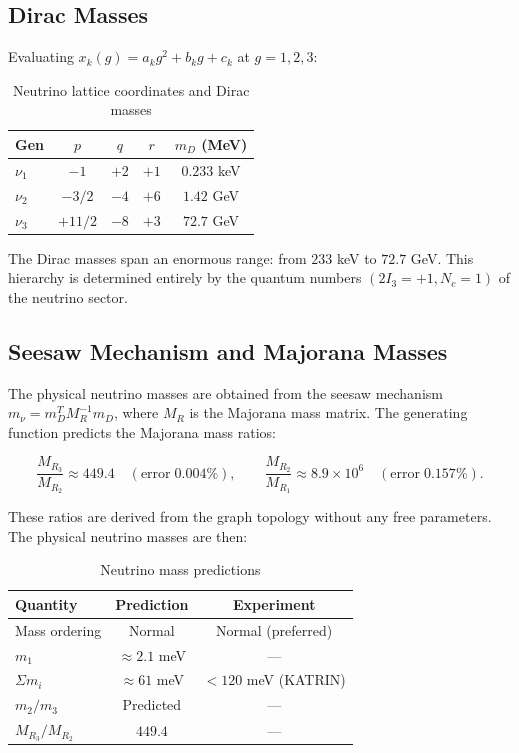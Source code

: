 \subsection{Dirac Masses}\label{sec:neutrino_dirac}

Evaluating $x_k(g) = a_k g^2 + b_k g + c_k$ at $g = 1, 2, 3$:

\begin{table}[h]
\centering
\caption{Neutrino lattice coordinates and Dirac masses}
\label{tab:neutrino_dirac_masses}
\begin{tabular}{lcccc}
\hline\hline
Gen & $p$ & $q$ & $r$ & $m_D$ (MeV) \\
\hline
$\nu_1$ & $-1$ & $+2$ & $+1$ & $0.233$ keV \\
$\nu_2$ & $-3/2$ & $-4$ & $+6$ & $1.42$ GeV \\
$\nu_3$ & $+11/2$ & $-8$ & $+3$ & $72.7$ GeV \\
\hline\hline
\end{tabular}
\end{table}

The Dirac masses span an enormous range: from $233$ keV to $72.7$ GeV. This hierarchy is determined entirely by the quantum numbers $(2I_3 = +1, N_c = 1)$ of the neutrino sector.

\subsection{Seesaw Mechanism and Majorana Masses}\label{sec:neutrino_seesaw}

The physical neutrino masses are obtained from the seesaw mechanism $m_\nu = m_D^T M_R^{-1} m_D$, where $M_R$ is the Majorana mass matrix. The generating function predicts the Majorana mass ratios:

\begin{equation}
\frac{M_{R_3}}{M_{R_2}} \approx 449.4 \quad (\mathrm{error}\; 0.004\%), \qquad
\frac{M_{R_2}}{M_{R_1}} \approx 8.9 \times 10^6 \quad (\mathrm{error}\; 0.157\%).
\end{equation}

These ratios are derived from the graph topology without any free parameters. The physical neutrino masses are then:

\begin{table}[h]
\centering
\caption{Neutrino mass predictions}
\label{tab:neutrino_masses}
\begin{tabular}{lcc}
\hline\hline
Quantity & Prediction & Experiment \\
\hline
Mass ordering & Normal & Normal (preferred) \\
$m_1$ & $\approx 2.1$ meV & --- \\
$\Sigma m_i$ & $\approx 61$ meV & $< 120$ meV (KATRIN) \\
$m_2/m_3$ & Predicted & --- \\
$M_{R_3}/M_{R_2}$ & $449.4$ & --- \\
\hline\hline
\end{tabular}
\end{table}

